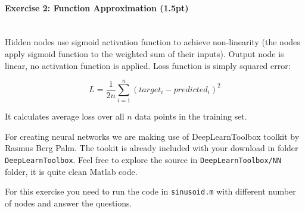 \documentclass[a4paper,11pt]{article}
\newenvironment{exercise}[3]{\paragraph{Exercise #1: #2 (#3pt)}\ \\}{
\medskip}
\begin{document}
\begin{exercise}{2}{Function Approximation}{1.5}
Hidden nodes use sigmoid activation function to achieve non-linearity (the nodes apply sigmoid function to the weighted sum of their inputs). Output node is linear, no activation function is applied. Loss function is simply squared error:

$$
L = \frac{1}{2n}\sum_{i=1}^{n} (target_i - predicted_i)^2
$$

It calculates average loss over all $n$ data points in the training set. \newline

For creating neural networks we are making use of DeepLearnToolbox toolkit by Rasmus Berg Palm. The tookit is already included with your download in folder \texttt{DeepLearnToolbox}. Feel free to explore the source in \texttt{DeepLearnToolbox/NN} folder, it is quite clean Matlab code.\newline


For this exercise you need to run the code in \texttt{sinusoid.m} with different number of nodes and answer the questions.


\end{exercise}
\end{document}
